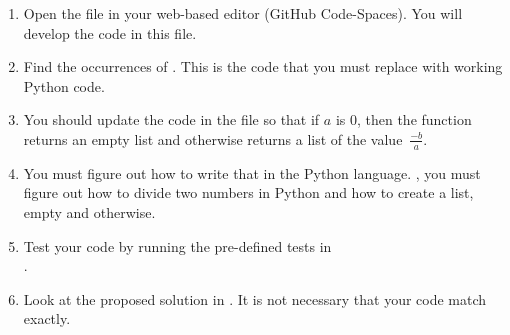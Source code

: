 \begin{enumerate}

\item Open the file  in your web-based editor
  (GitHub Code-Spaces).  You will develop the code in this file.

\item Find the occurrences of .
  This is the code that you must replace with working Python code.

\item You should update the code in the file  so
  that if $a$ is 0, then the function returns an empty list and
  otherwise returns a list of the value~$\frac{-b}{a}$.

\item You must figure out how to write that in the Python language.
  \Ie, you must figure out how to divide two numbers in Python and how
  to create a list, empty and otherwise.


\item Test your code by running the pre-defined tests in \\
  .

\item Look at the proposed solution in .  It
  is not necessary that your code match exactly.

\end{enumerate}

